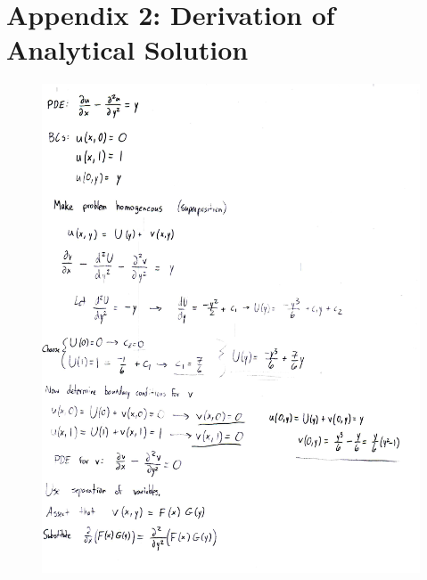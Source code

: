 \documentclass[10pt]{article}
\begin{document}
\section*{Appendix 2: Derivation of Analytical Solution}
\begin{figure}[H]
	\begin{center}
		\includegraphics[width=16cm]{app2_p1.jpg}
	\end{center}
\end{figure}
\pagebreak
\end{document}

